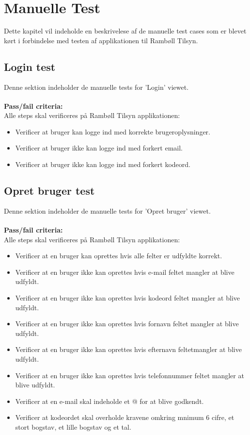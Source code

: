 \chapter{Manuelle Test} \label{sec:ManuelTest}
Dette kapitel vil indeholde en beskrivelese af de manuelle test cases som er blevet kørt i forbindelse med testen af applikationen til Rambøll Tilsyn.

\section{Login test}
Denne sektion indeholder de manuelle tests for 'Login' viewet. \\ \\
\textbf{Pass/fail criteria:} \\
Alle steps skal verificeres på Rambøll Tilsyn applikationen:
\begin{itemize}[-]
	\item Verificer at bruger kan logge ind med korrekte brugeroplysninger.
	\item Verificer at bruger ikke kan logge ind med forkert email.
	\item Verificer at bruger ikke kan logge ind med forkert kodeord. \\
\end{itemize}

\section{Opret bruger test}
Denne sektion indeholder de manuelle tests for 'Opret bruger' viewet. \\ \\
\textbf{Pass/fail criteria:} \\
Alle steps skal verificeres på Rambøll Tilsyn applikationen:
\begin{itemize}[-]
	\item Verificer at en bruger kan oprettes hvis alle felter er udfyldte korrekt.
	\item Verificer at en bruger ikke kan oprettes hvis e-mail feltet mangler at blive udfyldt.
	\item Verificer at en bruger ikke kan oprettes hvis kodeord feltet mangler at blive udfyldt.
	\item Verificer at en bruger ikke kan oprettes hvis fornavn feltet mangler at blive udfyldt.
	\item Verificer at en bruger ikke kan oprettes hvis efternavn feltetmangler at blive udfyldt.
	\item Verificer at en bruger ikke kan oprettes hvis telefonnummer feltet mangler at blive udfyldt.
	\item Verificer at en e-mail skal indeholde et @ for at blive godkendt.
	\item Verificer at kodeordet skal overholde kravene omkring mnimum 6 cifre, et stort bogstav, et lille bogstav og et tal.
\end{itemize}


